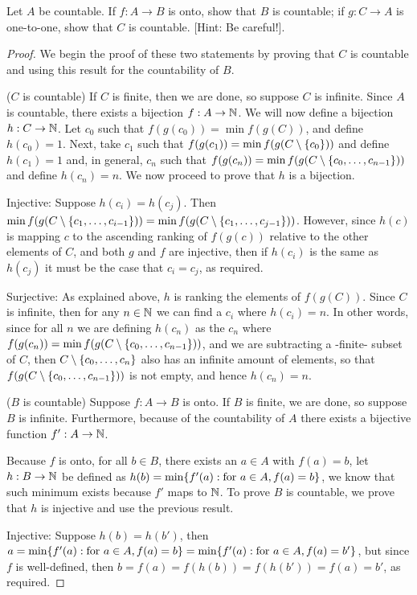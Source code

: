 \begin{exercise}{7}
Let $A$ be countable. If $f:A\to B$ is onto, show that $B$ is countable; if $g:C\to A$ is one-to-one, show that $C$ is countable. [Hint: Be careful!].
\end{exercise}
\begin{proof}
We begin the proof of these two statements by proving that $C$ is countable and using this result for the countability of $B$.

($C$ is countable) If $C$ is finite, then we are done, so suppose $C$ is infinite. Since $A$ is countable, there exists a bijection $f:A\to\mathbb{N}$. We will now define a bijection $h:C\to \mathbb{N}$. Let $c_0$ such that $f(g(c_0))=\min f(g(C))$, and define $h(c_0)=1$. Next, take $c_1$ such that $f(g(c_1))=\min f(g(C\setminus\{c_0\}))$ and define $h(c_1)=1$ and, in general, $c_n$ such that $f(g(c_n))=\min f(g(C\setminus\{c_0,\dots, c_{n-1}\}))$ and define $h(c_n)=n$. We now proceed to prove that $h$ is a bijection.

Injective: Suppose $h(c_i)=h(c_j)$. Then $\min f(g(C\setminus\{c_1,\dots,c_{i-1}\}))=\min f(g(C\setminus\{c_1,\dots,c_{j-1}\}))$. However, since $h(c)$ is mapping $c$ to the ascending ranking of $f(g(c))$ relative to the other elements of $C$, and both $g$ and $f$ are injective, then if $h(c_i)$ is the same as $h(c_j)$ it must be the case that $c_i=c_j$, as required. 

Surjective: As explained above, $h$ is ranking the elements of $f(g(C))$. Since $C$ is infinite, then for any $n\in\mathbb{N}$ we can find a $c_i$ where $h(c_i)=n$. In other words, since for all $n$ we are defining $h(c_n)$ as the $c_n$ where $f(g(c_n))=\min f(g(C\setminus\{c_0,\dots,c_{n-1}\}))$, and we are subtracting a -finite- subset of $C$, then $C\setminus\{c_0,\dots,c_n\}$ also has an infinite amount of elements, so that $f(g(C\setminus\{c_0,\dots,c_{n-1}\}))$ is not empty, and hence $h(c_n)=n$.

($B$ is countable) Suppose $f:A\to B$ is onto. If $B$ is finite, we are done, so suppose $B$ is infinite. Furthermore, because of the countability of $A$ there exists a bijective function $f':A\to\mathbb{N}$. 

Because $f$ is onto, for all $b\in B$, there exists an $a\in A$ with $f(a)=b$, let $h:B\to \mathbb{N}$ be defined as $h(b)=\min\{f'(a):\text{for }a\in A, f(a)=b\}$, we know that such minimum exists because $f'$ maps to $\mathbb{N}$. To prove $B$ is countable, we prove that $h$ is injective and use the previous result.

Injective: Suppose $h(b)=h(b')$, then $a=\min\{f'(a):\text{for }a\in A, f(a)=b\}=\min\{f'(a):\text{for }a\in A, f(a)=b'\}$, but since $f$ is well-defined, then $b=f(a)=f(h(b))=f(h(b'))=f(a)=b'$, as required.
\end{proof} 

